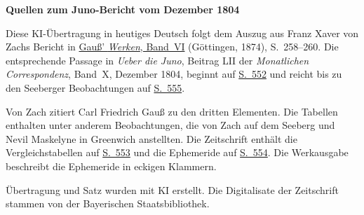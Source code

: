 \clearpage\thispagestyle{empty}
\begin{center}\textbf{Quellen zum Juno-Bericht vom Dezember 1804}\end{center}
\noindent Diese KI-Übertragung in heutiges Deutsch folgt dem Auszug aus Franz Xaver von Zachs Bericht in \href{https://gdz.sub.uni-goettingen.de/id/PPN236007467}{Gauß’ \textit{Werken}, Band~VI} (Göttingen, 1874), S.~258--260. Die entsprechende Passage in \textit{Ueber die Juno}, Beitrag LII der \textit{Monatlichen Correspondenz}, Band~X, Dezember 1804, beginnt auf \href{https://www.digitale-sammlungen.de/en/view/bsb10538602?page=566}{S.~552} und reicht bis zu den Seeberger Beobachtungen auf \href{https://www.digitale-sammlungen.de/en/view/bsb10538602?page=569}{S.~555}.
\par\smallskip\noindent Von Zach zitiert Carl Friedrich Gauß zu den dritten Elementen. Die Tabellen enthalten unter anderem Beobachtungen, die von Zach auf dem Seeberg und Nevil Maskelyne in Greenwich anstellten. Die Zeitschrift enthält die Vergleichstabellen auf \href{https://www.digitale-sammlungen.de/en/view/bsb10538602?page=567}{S.~553} und die Ephemeride auf \href{https://www.digitale-sammlungen.de/en/view/bsb10538602?page=568}{S.~554}. Die Werkausgabe beschreibt die Ephemeride in eckigen Klammern.
\par\smallskip\noindent Übertragung und Satz wurden mit KI erstellt. Die Digitalisate der Zeitschrift stammen von der Bayerischen Staatsbibliothek.
\clearpage
